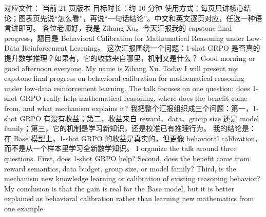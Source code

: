 \markdownRendererDocumentBegin
{}\markdownRendererInterblockSeparator
{}对应文件： 当前 21 页版本\markdownRendererLineBreak
{}目标时长：约 10 分钟\markdownRendererLineBreak
{}使用方式：每页只讲核心结论；图表页先说“怎么看”，再说“一句话结论”。中文和英文逐页对应，任选一种语言讲即可。\markdownRendererInterblockSeparator
{}\markdownRendererHorizontalRule{}\markdownRendererInterblockSeparator
{}\markdownRendererInterblockSeparator
{}\markdownRendererInterblockSeparator
{}各位老师好，我是 Zihang Xu。今天汇报我的 capstone final progress，题目是 Behavioral Calibration for Mathematical Reasoning under Low-Data Reinforcement Learning。\markdownRendererInterblockSeparator
{}这次汇报围绕一个问题：1-shot GRPO 是否真的提升数学推理？如果有，它的收益来自哪里，机制又是什么？\markdownRendererInterblockSeparator
{}\markdownRendererInterblockSeparator
{}Good morning or good afternoon everyone. My name is Zihang Xu. Today I will present my capstone final progress on behavioral calibration for mathematical reasoning under low-data reinforcement learning.\markdownRendererInterblockSeparator
{}The talk focuses on one question: does 1-shot GRPO really help mathematical reasoning, where does the benefit come from, and what mechanism explains it?\markdownRendererInterblockSeparator
{}\markdownRendererHorizontalRule{}\markdownRendererInterblockSeparator
{}\markdownRendererInterblockSeparator
{}\markdownRendererInterblockSeparator
{}我把整个汇报组织成三个问题：第一，1-shot GRPO 有没有收益；第二，收益来自 reward、data、group size 还是 model family；第三，它的机制是学习新知识，还是校准已有推理行为。\markdownRendererInterblockSeparator
{}我的结论是：在 Base 模型上，1-shot GRPO 的收益是真实的，但更像 behavioral calibration，而不是从一个样本里学习全新数学知识。\markdownRendererInterblockSeparator
{}\markdownRendererInterblockSeparator
{}I organize the talk around three questions. First, does 1-shot GRPO help? Second, does the benefit come from reward semantics, data budget, group size, or model family? Third, is the mechanism new knowledge learning or calibration of existing reasoning behavior?\markdownRendererInterblockSeparator
{}My conclusion is that the gain is real for the Base model, but it is better explained as behavioral calibration rather than learning new mathematics from one example.\markdownRendererInterblockSeparator
